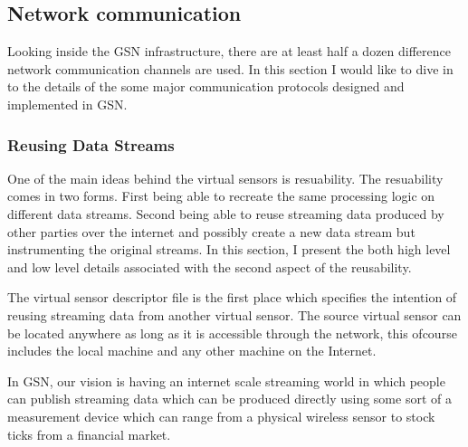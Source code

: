 
\subsection{Network communication}
Looking inside the GSN infrastructure, there are at least half a dozen difference network communication channels are used. In this section I would like to dive in to the details
of the some major communication protocols designed and implemented in GSN. 

\subsubsection{Reusing Data Streams}

One of the main ideas behind the virtual sensors is resuability. The resuability comes in two forms.
First being able to recreate the same processing logic on different data streams.
Second being able to reuse streaming data produced by other parties over the internet and possibly create a new data stream but instrumenting the original streams.
In this section, I present the both high level and low level details associated with the second aspect of the reusability.

The virtual sensor descriptor file is the first place which specifies the intention of reusing streaming data from another virtual sensor. The source virtual sensor can be located
anywhere as long as it is accessible through the network, this ofcourse includes the local machine and any other machine on the Internet. 


In GSN, our vision is having an internet scale streaming world in which people can publish streaming data which
can be produced directly using some sort of a measurement device which can range from a physical wireless sensor to stock ticks from a financial market.







